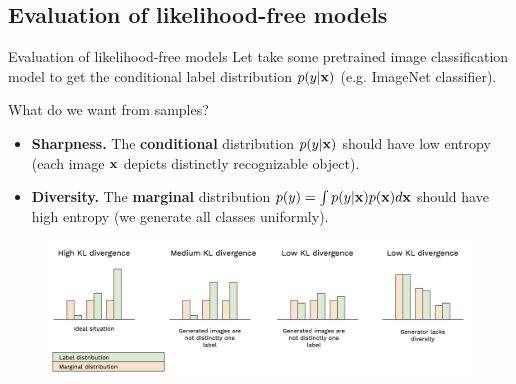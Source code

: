 \subsection{Evaluation of likelihood-free models}
\begin{frame}{Evaluation of likelihood-free models}
	Let take some pretrained image classification model to get the conditional label distribution $p(y | \mathbf{x})$ (e.g. ImageNet classifier).
	\begin{block}{What do we want from samples?}
		\begin{itemize}
			\item \textbf{Sharpness.}
			The \textbf{conditional} distribution $p(y | \mathbf{x})$ should have low entropy (each image $\mathbf{x}$ depicts distinctly recognizable object).
			\item \textbf{Diversity.}
			The \textbf{marginal} distribution $p(y) = \int p(y | \mathbf{x}) p(\mathbf{x}) d \mathbf{x}$ should have high entropy (we generate all classes uniformly).
		\end{itemize}
	\end{block}
	\vspace{-0.3cm}
	\begin{figure}
		\centering
		\includegraphics[width=1.0\linewidth]{figs/is_toy}
	\end{figure}
\end{frame}
